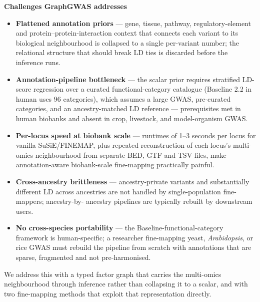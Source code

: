 \documentclass[11pt,a4paper]{article}
\begin{document}
\textbf{Challenges GraphGWAS addresses}
\begin{itemize}
\item \textbf{Flattened annotation priors} --- gene, tissue, pathway, regulatory-element and
protein--protein-interaction context that connects each variant to its biological neighbourhood
is collapsed to a single per-variant number; the relational structure that should break LD ties
is discarded before the inference runs.
\item \textbf{Annotation-pipeline bottleneck} --- the scalar prior requires stratified LD-score
regression over a curated functional-category catalogue (Baseline 2.2 in human uses 96
categories), which assumes a large GWAS, pre-curated categories, and an ancestry-matched LD
reference --- prerequisites met in human biobanks and absent in crop, livestock, and model-organism GWAS.
\item \textbf{Per-locus speed at biobank scale} --- runtimes of 1--3 seconds per locus for
vanilla SuSiE/FINEMAP, plus repeated reconstruction of each locus's multi-omics neighbourhood
from separate BED, GTF and TSV files, make annotation-aware biobank-scale fine-mapping
practically painful.
\item \textbf{Cross-ancestry brittleness} --- ancestry-private variants and substantially
different LD across ancestries are not handled by single-population fine-mappers; ancestry-by-
ancestry pipelines are typically rebuilt by downstream users.
\item \textbf{No cross-species portability} --- the Baseline-functional-category framework is
human-specific; a researcher fine-mapping yeast, \emph{Arabidopsis}, or rice GWAS must rebuild
the pipeline from scratch with annotations that are sparse, fragmented and not pre-harmonised.
\end{itemize}

We address this with a typed factor graph that carries the multi-omics neighbourhood through
inference rather than collapsing it to a scalar, and with two fine-mapping methods that exploit
that representation directly.
\end{document}
